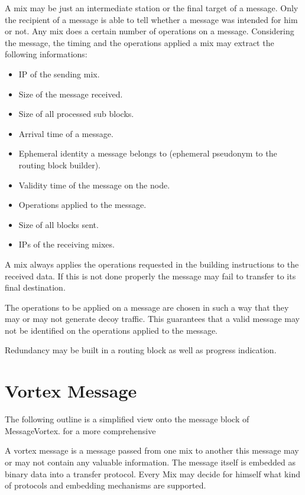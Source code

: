 A mix may be just an intermediate station or the final target of a message. Only the recipient of a message is able to tell whether a message was intended for him or not. Any mix does a certain number of operations on a message. Considering the message, the timing and the operations applied a mix may extract the following informations:

\begin{itemize}
	\item IP of the sending mix.
	\item Size of the message received.
	\item Size of all processed sub blocks.
	\item Arrival time of a message.
	\item Ephemeral identity a message belongs to (ephemeral pseudonym to the routing block builder).
	\item Validity time of the message on the node.
	\item Operations applied to the message.
	\item Size of all blocks sent.
	\item IPs of the receiving mixes.
\end{itemize}

A mix always applies the operations requested in the building instructions to the received data. If this is not done properly the message may fail to transfer to its final destination. 

The operations to be applied on a message are chosen in such a way that they may or may not generate decoy traffic. This guarantees that a valid message may not be identified on the operations applied to the message.

Redundancy may be built in a routing block as well as progress indication.

\section{Vortex Message}
The following outline is a simplified view onto the message block of MessageVortex. for a more comprehensive

A vortex message is a message passed from one mix to another this message may or may not contain any valuable information. The message itself is embedded as binary data into a transfer protocol. Every Mix may decide for himself what kind of protocols and embedding mechanisms are supported.

